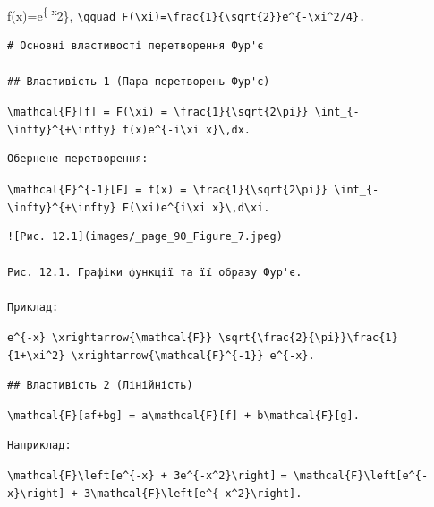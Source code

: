 \documentclass[
  ukrainian,
]{article}
\begin{document}
f(x)=e\textsuperscript{\{-x}2\},
\texttt{\textbackslash{}qquad\ F(\textbackslash{}xi)=\textbackslash{}frac\{1\}\{\textbackslash{}sqrt\{2\}\}e\^{}\{-\textbackslash{}xi\^{}2/4\}.}

\begin{verbatim}
# Основні властивості перетворення Фур'є

## Властивість 1 (Пара перетворень Фур'є)
\end{verbatim}

\texttt{\textbackslash{}mathcal\{F\}{[}f{]}\ =\ F(\textbackslash{}xi)\ =\ \textbackslash{}frac\{1\}\{\textbackslash{}sqrt\{2\textbackslash{}pi\}\}\ \textbackslash{}int\_\{-\textbackslash{}infty\}\^{}\{+\textbackslash{}infty\}\ f(x)e\^{}\{-i\textbackslash{}xi\ x\}\textbackslash{},dx.}

\begin{verbatim}
Обернене перетворення:
\end{verbatim}

\texttt{\textbackslash{}mathcal\{F\}\^{}\{-1\}{[}F{]}\ =\ f(x)\ =\ \textbackslash{}frac\{1\}\{\textbackslash{}sqrt\{2\textbackslash{}pi\}\}\ \textbackslash{}int\_\{-\textbackslash{}infty\}\^{}\{+\textbackslash{}infty\}\ F(\textbackslash{}xi)e\^{}\{i\textbackslash{}xi\ x\}\textbackslash{},d\textbackslash{}xi.}

\begin{verbatim}
![Рис. 12.1](images/_page_90_Figure_7.jpeg)

Рис. 12.1. Графіки функції та її образу Фур'є.

Приклад:
\end{verbatim}

\texttt{e\^{}\{-\textbar{}x\textbar{}\}\ \textbackslash{}xrightarrow\{\textbackslash{}mathcal\{F\}\}\ \textbackslash{}sqrt\{\textbackslash{}frac\{2\}\{\textbackslash{}pi\}\}\textbackslash{}frac\{1\}\{1+\textbackslash{}xi\^{}2\}\ \textbackslash{}xrightarrow\{\textbackslash{}mathcal\{F\}\^{}\{-1\}\}\ e\^{}\{-\textbar{}x\textbar{}\}.}

\begin{verbatim}
## Властивість 2 (Лінійність)
\end{verbatim}

\texttt{\textbackslash{}mathcal\{F\}{[}af+bg{]}\ =\ a\textbackslash{}mathcal\{F\}{[}f{]}\ +\ b\textbackslash{}mathcal\{F\}{[}g{]}.}

\begin{verbatim}
Наприклад:
\end{verbatim}

\texttt{\textbackslash{}mathcal\{F\}\textbackslash{}left{[}e\^{}\{-\textbar{}x\textbar{}\}\ +\ 3e\^{}\{-x\^{}2\}\textbackslash{}right{]}}
\texttt{=\ \textbackslash{}mathcal\{F\}\textbackslash{}left{[}e\^{}\{-\textbar{}x\textbar{}\}\textbackslash{}right{]}\ +\ 3\textbackslash{}mathcal\{F\}\textbackslash{}left{[}e\^{}\{-x\^{}2\}\textbackslash{}right{]}.}
\end{document}
